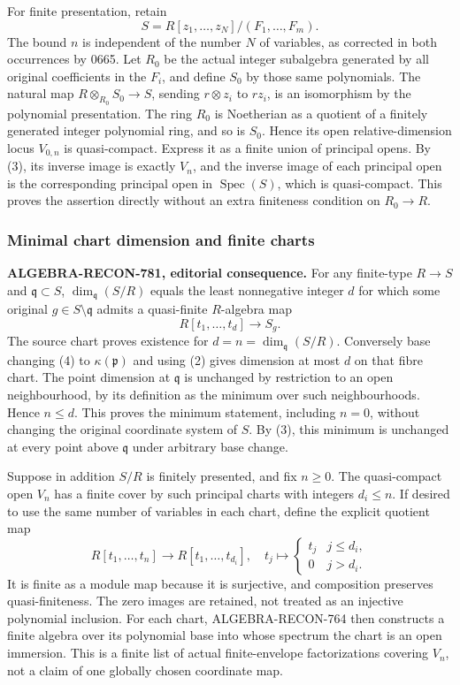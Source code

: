 For finite presentation, retain \[
 S=R[z_1,\ldots,z_N]/(F_1,\ldots,F_m).
\] The bound \(n\) is independent of the number \(N\) of variables, as corrected in both occurrences by 0665. Let \(R_0\) be the actual integer subalgebra generated by all original coefficients in the \(F_i\), and define \(S_0\) by those same polynomials. The natural map \(R\otimes_{R_0}S_0\to S\), sending \(r\otimes z_i\) to \(rz_i\), is an isomorphism by the polynomial presentation. The ring \(R_0\) is Noetherian as a quotient of a finitely generated integer polynomial ring, and so is \(S_0\). Hence its open relative-dimension locus \(V_{0,n}\) is quasi-compact. Express it as a finite union of principal opens. By (3), its inverse image is exactly \(V_n\), and the inverse image of each principal open is the corresponding principal open in \(\operatorname{Spec}(S)\), which is quasi-compact. This proves the assertion directly without an extra finiteness condition on \(R_0\to R\).

\subsubsection{Minimal chart dimension and finite charts}\label{algebra-proof-034-minimal-chart-dimension-and-finite-charts}

\textbf{ALGEBRA-RECON-781, editorial consequence.} For any finite-type \(R\to S\) and \(\mathfrak q\subset S\), \(\dim_{\mathfrak q}(S/R)\) equals the least nonnegative integer \(d\) for which some original \(g\in S\setminus\mathfrak q\) admits a quasi-finite \(R\)-algebra map \[
 R[t_1,\ldots,t_d]\longrightarrow S_g.
 \tag{4}
\] The source chart proves existence for \(d=n=\dim_{\mathfrak q}(S/R)\). Conversely base changing (4) to \(\kappa(\mathfrak p)\) and using (2) gives dimension at most \(d\) on that fibre chart. The point dimension at \(\mathfrak q\) is unchanged by restriction to an open neighbourhood, by its definition as the minimum over such neighbourhoods. Hence \(n\leq d\). This proves the minimum statement, including \(n=0\), without changing the original coordinate system of \(S\). By (3), this minimum is unchanged at every point above \(\mathfrak q\) under arbitrary base change.

Suppose in addition \(S/R\) is finitely presented, and fix \(n\geq0\). The quasi-compact open \(V_n\) has a finite cover by such principal charts with integers \(d_i\leq n\). If desired to use the same number of variables in each chart, define the explicit quotient map \[
 R[t_1,\ldots,t_n]\longrightarrow R[t_1,\ldots,t_{d_i}],
 \quad t_j\longmapsto
 \begin{cases}t_j&j\leq d_i,\\0&j>d_i.\end{cases}
\] It is finite as a module map because it is surjective, and composition preserves quasi-finiteness. The zero images are retained, not treated as an injective polynomial inclusion. For each chart, ALGEBRA-RECON-764 then constructs a finite algebra over its polynomial base into whose spectrum the chart is an open immersion. This is a finite list of actual finite-envelope factorizations covering \(V_n\), not a claim of one globally chosen coordinate map.

